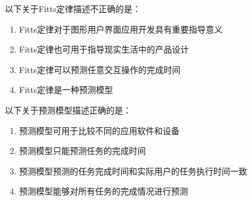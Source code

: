 \begin{problem}
	以下关于Fitts定律描述不正确的是： 
        \begin{enumerate}[label=\Alph*.]
            \item Fitts定律对于图形用户界面应用开发具有重要指导意义
            \item Fitts定律也可用于指导现实生活中的产品设计
            \item Fitts定律可以预测任意交互操作的完成时间
            \item Fitts定律是一种预测模型
        \end{enumerate}
\end{problem}


\begin{problem}
	以下关于预测模型描述正确的是：
        \begin{enumerate}[label=\Alph*.]
            \item 预测模型可用于比较不同的应用软件和设备
            \item 预测模型只能预测任务的完成时间
            \item 预测模型预测的任务完成时间和实际用户的任务执行时间一致
            \item 预测模型能够对所有任务的完成情况进行预测
        \end{enumerate}
\end{problem}


